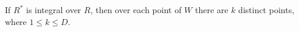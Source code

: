If $R^*$ is integral over $R$, then over each point of $W$ there are $k$ distinct points, where $1 \leqslant k \leqslant D$.
